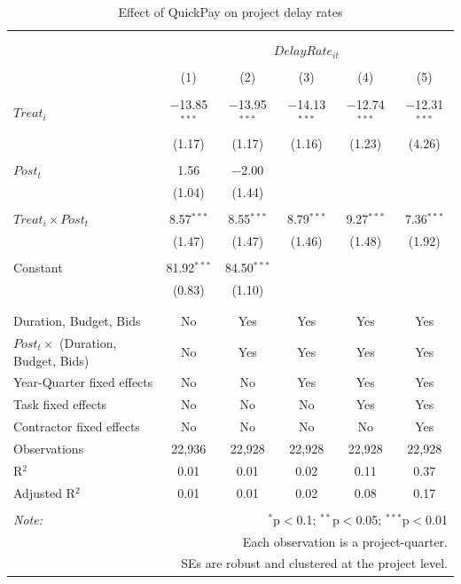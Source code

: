 \documentclass[
]{article}
\begin{document}
\begin{table}[H] \centering 
  \caption{Effect of QuickPay on project delay rates} 
  \label{} 
\small 
\begin{tabular}{@{\extracolsep{-2pt}}lccccc} 
\\[-1.8ex]\hline 
\hline \\[-1.8ex] 
\\[-1.8ex] & \multicolumn{5}{c}{$DelayRate_{it}$} \\ 
\\[-1.8ex] & (1) & (2) & (3) & (4) & (5)\\ 
\hline \\[-1.8ex] 
 $Treat_i$ & $-$13.85$^{***}$ & $-$13.95$^{***}$ & $-$14.13$^{***}$ & $-$12.74$^{***}$ & $-$12.31$^{***}$ \\ 
  & (1.17) & (1.17) & (1.16) & (1.23) & (4.26) \\ 
  & & & & & \\ 
 $Post_t$ & 1.56 & $-$2.00 &  &  &  \\ 
  & (1.04) & (1.44) &  &  &  \\ 
  & & & & & \\ 
 $Treat_i \times Post_t$ & 8.57$^{***}$ & 8.55$^{***}$ & 8.79$^{***}$ & 9.27$^{***}$ & 7.36$^{***}$ \\ 
  & (1.47) & (1.47) & (1.46) & (1.48) & (1.92) \\ 
  & & & & & \\ 
 Constant & 81.92$^{***}$ & 84.50$^{***}$ &  &  &  \\ 
  & (0.83) & (1.10) &  &  &  \\ 
  & & & & & \\ 
\hline \\[-1.8ex] 
Duration, Budget, Bids & No & Yes & Yes & Yes & Yes \\ 
$Post_t \times$  (Duration, Budget, Bids) & No & Yes & Yes & Yes & Yes \\ 
Year-Quarter fixed effects & No & No & Yes & Yes & Yes \\ 
Task fixed effects & No & No & No & Yes & Yes \\ 
Contractor fixed effects & No & No & No & No & Yes \\ 
Observations & 22,936 & 22,928 & 22,928 & 22,928 & 22,928 \\ 
R$^{2}$ & 0.01 & 0.01 & 0.02 & 0.11 & 0.37 \\ 
Adjusted R$^{2}$ & 0.01 & 0.01 & 0.02 & 0.08 & 0.17 \\ 
\hline 
\hline \\[-1.8ex] 
\textit{Note:}  & \multicolumn{5}{r}{$^{*}$p$<$0.1; $^{**}$p$<$0.05; $^{***}$p$<$0.01} \\ 
 & \multicolumn{5}{r}{Each observation is a project-quarter.} \\ 
 & \multicolumn{5}{r}{SEs are robust and clustered at the project level.} \\ 
\end{tabular} 
\end{table}
\end{document}
